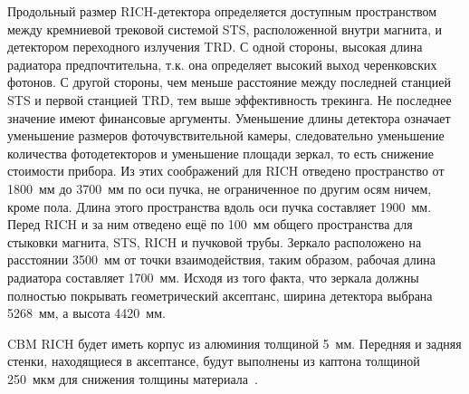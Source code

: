 Продольный размер RICH-детектора определяется доступным пространством между кремниевой трековой системой STS, расположенной внутри магнита, и детектором переходного излучения TRD. С одной стороны, высокая длина радиатора предпочтительна, т.к. она определяет высокий выход черенковских фотонов. С другой стороны, чем меньше расстояние между последней станцией STS и первой станцией TRD, тем выше эффективность трекинга. Не последнее значение имеют финансовые аргументы. Уменьшение длины детектора означает уменьшение размеров фоточувствительной камеры, следовательно уменьшение количества фотодетекторов и уменьшение площади зеркал, то есть снижение стоимости прибора.
Из этих соображений для RICH отведено пространство от 1800~мм до 3700~мм по оси пучка, не ограниченное по другим осям ничем, кроме пола. Длина этого пространства вдоль оси пучка составляет 1900~мм. Перед RICH и за ним отведено ещё по 100~мм общего пространства для стыковки магнита, STS, RICH и пучковой трубы. Зеркало расположено на расстоянии 3500~мм от точки взаимодействия, таким образом, рабочая длина радиатора составляет 1700~мм. Исходя из того факта, что зеркала должны полностью покрывать геометрический аксептанс, ширина детектора выбрана 5268~мм, а высота 4420~мм.

CBM RICH будет иметь корпус из алюминия толщиной 5~мм. Передняя и задняя стенки, находящиеся в аксептансе, будут выполнены из каптона толщиной 250~мкм для снижения толщины материала~\cite{TDR_RICH}.



